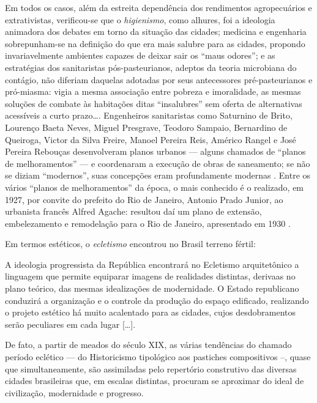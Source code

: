 Em todos os casos, além da estreita dependência dos rendimentos agropecuários e extrativistas, verificou-se que o \textit{higienismo}, como alhures, foi a ideologia animadora dos debates em torno da situação das cidades; medicina e engenharia sobrepunham-se na definição do que era mais salubre para as cidades, propondo invariavelmente ambientes capazes de deixar sair os ``maus odores''; e as estratégias dos sanitaristas pós-pasteurianos, adeptos da teoria microbiana do contágio, não diferiam daquelas adotadas por seus antecessores pré-pasteurianos e pró-miasma: vigia a mesma associação entre pobreza e imoralidade, as mesmas soluções de combate às habitações ditas ``insalubres'' sem oferta de alternativas acessíveis a curto prazo\dots \cite{CAPONI2002}. Engenheiros sanitaristas como Saturnino de Brito, Lourenço Baeta Neves, Miguel Presgrave, Teodoro Sampaio, Bernardino de Queiroga, Victor da Silva Freire, Manoel Pereira Reis, Américo Rangel e José Pereira Rebouças desenvolveram planos urbanos --- alguns chamados de ``planos de melhoramentos'' \cite{leme_urbasp_1991} --- e coordenaram a execução de obras de saneamento; se não se diziam ``modernos'', suas concepções eram profundamente modernas \cite{andrade_saturnino_1991}. Entre os vários ``planos de melhoramentos'' da época, o mais conhecido é o realizado, em 1927, por convite do prefeito do Rio de Janeiro, Antonio Prado Junior, ao urbanista francês Alfred Agache: resultou daí um plano de extensão, embelezamento e remodelação para o Rio de Janeiro, apresentado em 1930 \cite{pinheiro_capiconsul_2009}. 

Em termos estéticos, o \textit{ecletismo} encontrou no Brasil terreno fértil:

\begin{citacao}
A ideologia progressista da República encontrará no Ecletismo arquitetônico a linguagem que permite equiparar imagens de realidades distintas, derivaas no plano teórico, das mesmas idealizações de modernidade. O Estado republicano conduzirá a organização e o controle da produção do espaço edificado, realizando o projeto estético há muito acalentado para as cidades, cujos desdobramentos serão peculiares em cada lugar [\dots].

De fato, a partir de meados do século XIX, as várias tendências do chamado período eclético --- do Historicismo tipológico aos pastiches compositivos --, quase que simultaneamente, são assimiladas pelo repertório construtivo das diversas cidades brasileiras que, em escalas distintas, procuram se aproximar do ideal de civilização, modernidade e progresso. \cite[p.~259-260]{almeida_vitrinescomercio_2014}
\end{citacao}

